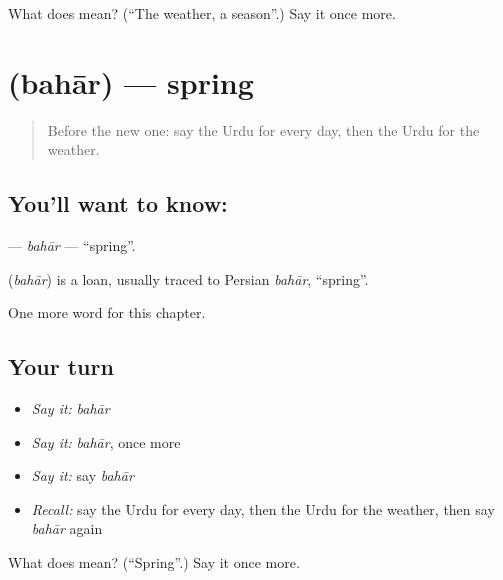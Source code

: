 \begin{tcolorbox}[breakable,colback=teal!4,colframe=teal!35!black,title={Before you move on}]
What does  mean? (\textquotedblleft{}The weather, a season\textquotedblright{}.) Say it once more.
\end{tcolorbox}
\section[\texorpdfstring{\ur{بہار} (bahār)}{بہار (bahār)}]{ (bahār) — spring}

\label{lesson:UR-C94-bahar}



\begin{quote}
Before the new one: say the Urdu for every day, then the Urdu for the weather.
\end{quote}

\subsection*{You'll want to know: }
\textbf{} — \emph{bahār} — \textquotedblleft{}spring\textquotedblright{}.

\begin{cousinweb}
\textbf{} (\emph{bahār}) is a loan, usually traced to Persian \emph{bahār}, \textquotedblleft{}spring\textquotedblright{}.
\end{cousinweb}

\begin{grammarlens}[title={What you've built}]
One more word for this chapter.
\end{grammarlens}

\subsection*{Your turn}
\begin{itemize}
\raggedright
  \item \emph{Say it:} \emph{bahār}
  \item \emph{Say it:} \emph{bahār}, once more
  \item \emph{Say it:} say \emph{bahār}
  \item \emph{Recall:} say the Urdu for every day, then the Urdu for the weather, then say \emph{bahār} again
\end{itemize}

\begin{tcolorbox}[breakable,colback=teal!4,colframe=teal!35!black,title={Before you move on}]
What does  mean? (\textquotedblleft{}Spring\textquotedblright{}.) Say it once more.
\end{tcolorbox}
